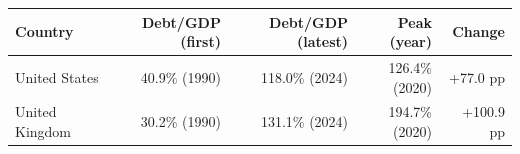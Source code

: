 \begin{tabular}{lrrrr}
\toprule
Country & Debt/GDP (first) & Debt/GDP (latest) & Peak (year) & Change \\
\midrule
United States & 40.9\% (1990) & 118.0\% (2024) & 126.4\% (2020) & +77.0 pp \\
United Kingdom & 30.2\% (1990) & 131.1\% (2024) & 194.7\% (2020) & +100.9 pp \\
\bottomrule
\end{tabular}
